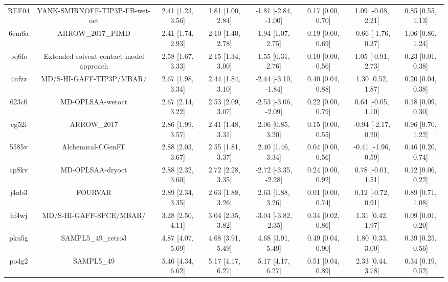 \documentclass{article}
\begin{document}
\begin{center}
\begin{longtable}{|cccccccc|}
 REF04 &                     YANK-SMIRNOFF-TIP3P-FB-wet-oct &  2.41 [1.23, 3.56] &  1.81 [1.00, 2.84] &  -1.81 [-2.84, -1.00] &  0.17 [0.00, 0.70] &   1.09 [-0.08, 2.21] &     0.85 [0.55, 1.13] \\
 6cm6a &                                  ARROW\_2017\_PIMD &  2.41 [1.74, 2.93] &  2.10 [1.40, 2.78] &     1.94 [1.07, 2.75] &  0.19 [0.00, 0.69] &  -0.66 [-1.76, 0.37] &     1.06 [0.86, 1.24] \\
 bq6fo &            Extended solvent-contact model approach &  2.58 [1.67, 3.33] &  2.15 [1.34, 3.00] &     1.55 [0.31, 2.76] &  0.10 [0.00, 0.56] &   1.05 [-0.91, 2.73] &     0.23 [0.01, 0.38] \\
 4nfzz &                           MD/S-HI-GAFF-TIP3P/MBAR/ &  2.67 [1.98, 3.34] &  2.44 [1.84, 3.10] &  -2.44 [-3.10, -1.84] &  0.40 [0.04, 0.88] &    1.30 [0.52, 1.87] &     0.20 [0.04, 0.38] \\
 623c0 &                                   MD-OPLSAA-wetoct &  2.67 [2.14, 3.22] &  2.53 [2.09, 3.07] &  -2.53 [-3.06, -2.09] &  0.22 [0.00, 0.79] &   0.64 [-0.05, 1.10] &     0.18 [0.09, 0.30] \\
 eg52i &                                        ARROW\_2017 &  2.86 [1.99, 3.57] &  2.41 [1.48, 3.31] &     2.06 [0.85, 3.20] &  0.15 [0.00, 0.55] &  -0.94 [-2.17, 0.20] &     0.96 [0.70, 1.22] \\
 5585v &                                  Alchemical-CGenFF &  2.88 [2.03, 3.67] &  2.55 [1.81, 3.37] &     2.40 [1.46, 3.34] &  0.04 [0.00, 0.56] &  -0.41 [-1.96, 0.59] &     0.46 [0.20, 0.74] \\
 cp8kv &                                   MD-OPLSAA-dryoct &  2.88 [2.32, 3.60] &  2.72 [2.28, 3.35] &  -2.72 [-3.35, -2.28] &  0.24 [0.00, 0.92] &   0.78 [-0.01, 1.51] &     0.12 [0.06, 0.22] \\
 j4nb3 &                                            FOURVAR &  2.89 [2.34, 3.35] &  2.63 [1.88, 3.26] &     2.63 [1.88, 3.26] &  0.01 [0.00, 0.74] &   0.12 [-0.72, 0.91] &     0.89 [0.71, 1.08] \\
 hf4wj &                            MD/S-HI-GAFF-SPCE/MBAR/ &  3.28 [2.50, 4.11] &  3.04 [2.35, 3.82] &  -3.04 [-3.82, -2.35] &  0.34 [0.02, 0.86] &    1.31 [0.42, 1.97] &     0.09 [0.01, 0.20] \\
 pku5g &                                 SAMPL5\_49\_retro3 &  4.87 [4.07, 5.69] &  4.68 [3.91, 5.49] &     4.68 [3.91, 5.49] &  0.49 [0.04, 0.90] &    1.80 [0.33, 3.00] &     0.39 [0.25, 0.56] \\
 po4g2 &                                         SAMPL5\_49 &  5.46 [4.34, 6.62] &  5.17 [4.17, 6.27] &     5.17 [4.17, 6.27] &  0.51 [0.04, 0.89] &    2.33 [0.44, 3.78] &     0.34 [0.19, 0.52] \\
\end{longtable}
\end{center}
\end{document}
